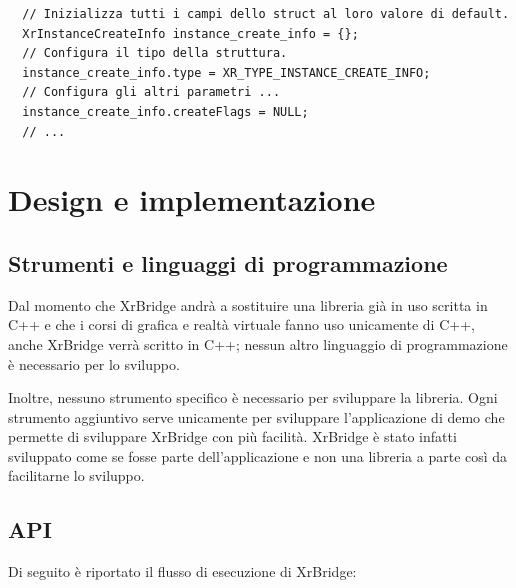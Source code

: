 \documentclass[twoside]{supsistudent}
\begin{document}
\begin{verbatim}
  // Inizializza tutti i campi dello struct al loro valore di default.
  XrInstanceCreateInfo instance_create_info = {};
  // Configura il tipo della struttura.
  instance_create_info.type = XR_TYPE_INSTANCE_CREATE_INFO;
  // Configura gli altri parametri ...
  instance_create_info.createFlags = NULL;
  // ...
\end{verbatim}

\chapter{Design e implementazione}

\section{Strumenti e linguaggi di programmazione}

Dal momento che XrBridge andrà a sostituire una libreria già in uso scritta in C++ e che i corsi di grafica e realtà virtuale fanno uso unicamente di C++, anche XrBridge verrà scritto in C++; nessun altro linguaggio di programmazione è necessario per lo sviluppo.

Inoltre, nessuno strumento specifico è necessario per sviluppare la libreria. Ogni strumento aggiuntivo serve unicamente per sviluppare l'applicazione di demo che permette di sviluppare XrBridge con più facilità. XrBridge è stato infatti sviluppato come se fosse parte dell'applicazione e non una libreria a parte così da facilitarne lo sviluppo.

\section{API}

Di seguito è riportato il flusso di esecuzione di XrBridge:
\end{document}
